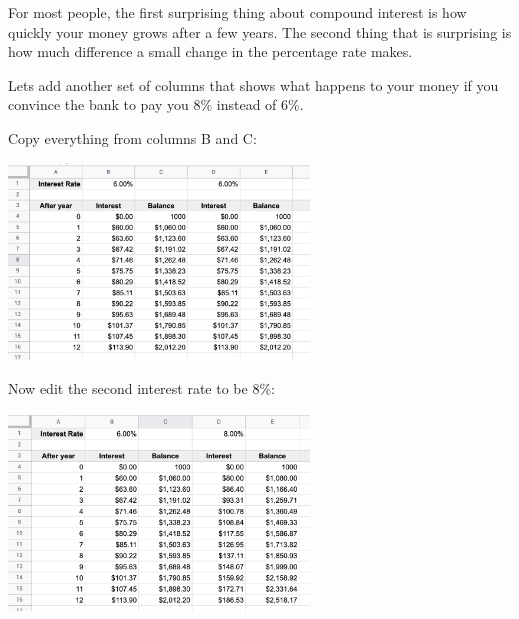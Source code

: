 For most people, the first surprising thing about compound interest is
how quickly your money grows after a few years.  The second thing that
is surprising is how much difference a small change in the percentage
rate makes.

Lets add another set of columns that shows what happens to your money
if you convince the bank to pay you 8\% instead of 6\%.

Copy everything from columns B and C:

\includegraphics[width=0.6\textwidth]{CopyForSecondInterest.png}

Now edit the second interest rate to be 8\%:

\includegraphics[width=0.6\textwidth]{AtBiggerInterestRate.png}

